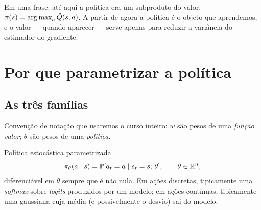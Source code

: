 \documentclass[11pt]{article}
\newcommand{\thv}{\theta}
\newcommand{\wv}{w}
\newcommand{\polth}{\pol_{\thv}}
\newcommand{\Qhat}{\hat{Q}}
\begin{document}
\begin{ideiabox}
Em uma frase: até aqui a política era um subproduto do valor,
$\pol(s)=\argmax_a \Qhat(s,a)$. A partir de agora a política é o objeto que
aprendemos, e o valor --- quando aparecer --- serve apenas para reduzir a
variância do estimador do gradiente.
\end{ideiabox}

\section{Por que parametrizar a política}

\subsection{As três famílias}

\begin{center}
\end{center}

Convenção de notação que usaremos o curso inteiro: $\wv$ são pesos de uma
\emph{função valor}; $\thv$ são pesos de uma \emph{política}.

\begin{defbox}{Política estocástica parametrizada}
\[
  \polth(a \mid s) = \Prob[a_t = a \mid s_t = s;\, \thv],
  \qquad \thv \in \R^{n},
\]
diferenciável em $\thv$ sempre que é não nula. Em ações discretas, tipicamente
uma \emph{softmax} sobre \emph{logits} produzidos por um modelo; em ações
contínuas, tipicamente uma gaussiana cuja média (e possivelmente o desvio) sai
do modelo.
\end{defbox}
\end{document}

